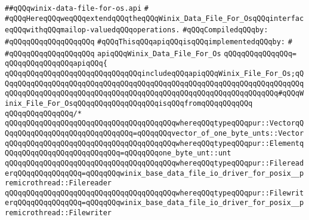 \label{src/lib/std/src/io/winix-data-file-for-os.api}
\verb|##qQQqwinix-data-file-for-os.api|\newline
\verb|#|\newline
\verb|#qQQqHereqQQqweqQQqextendqQQqtheqQQqWinix_Data_File_For_OsqQQqinterfaceqQQqwithqQQqmailop-valuedqQQqoperations.|\newline
\newline
\verb|#qQQqCompiledqQQqby:|\newline
\verb|#qQQqqQQqqQQqqQQqqQQq|\newline
\newline
\newline
\newline
\verb|#qQQqThisqQQqapiqQQqisqQQqimplementedqQQqby:|\newline
\verb|#|\newline
\verb|#qQQqqQQqqQQqqQQqqQQq|\newline
\newline
\verb|apiqQQqWinix_Data_File_For_Os|\newline
\verb|qQQqqQQqqQQqqQQq=|\newline
\verb|qQQqqQQqqQQqqQQqapiqQQq{|\newline
\newline
\verb|qQQqqQQqqQQqqQQqqQQqqQQqqQQqqQQqincludeqQQqapiqQQqWinix_File_For_Os;qQQqqQQqqQQqqQQqqQQqqQQqqQQqqQQqqQQqqQQqqQQqqQQqqQQqqQQqqQQqqQQqqQQqqQQqqQQqqQQqqQQqqQQqqQQqqQQqqQQqqQQqqQQqqQQqqQQqqQQqqQQqqQQqqQQqqQQq#qQQqWinix_File_For_OsqQQqqQQqqQQqqQQqqQQqisqQQqfromqQQqqQQqqQQq|\newline
\verb|qQQqqQQqqQQqqQQq/*|\newline
\verb|qQQqqQQqqQQqqQQqqQQqqQQqqQQqqQQqqQQqqQQqwhereqQQqtypeqQQqpur::VectorqQQqqQQqqQQqqQQqqQQqqQQqqQQqqQQq=qQQqqQQqvector_of_one_byte_unts::Vector|\newline
\verb|qQQqqQQqqQQqqQQqqQQqqQQqqQQqqQQqqQQqqQQqwhereqQQqtypeqQQqpur::ElementqQQqqQQqqQQqqQQqqQQqqQQqqQQq=qQQqqQQqone_byte_unt::unt|\newline
\verb|qQQqqQQqqQQqqQQqqQQqqQQqqQQqqQQqqQQqqQQqwhereqQQqtypeqQQqpur::FilereaderqQQqqQQqqQQqqQQq=qQQqqQQqwinix_base_data_file_io_driver_for_posix__premicrothread::Filereader|\newline
\verb|qQQqqQQqqQQqqQQqqQQqqQQqqQQqqQQqqQQqqQQqwhereqQQqtypeqQQqpur::FilewriterqQQqqQQqqQQqqQQq=qQQqqQQqwinix_base_data_file_io_driver_for_posix__premicrothread::Filewriter|\newline
